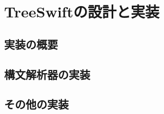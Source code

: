 \chapter{TreeSwiftの設計と実装}
\label{treeswift}

\section{実装の概要}

\section{構文解析器の実装}

\section{その他の実装}

